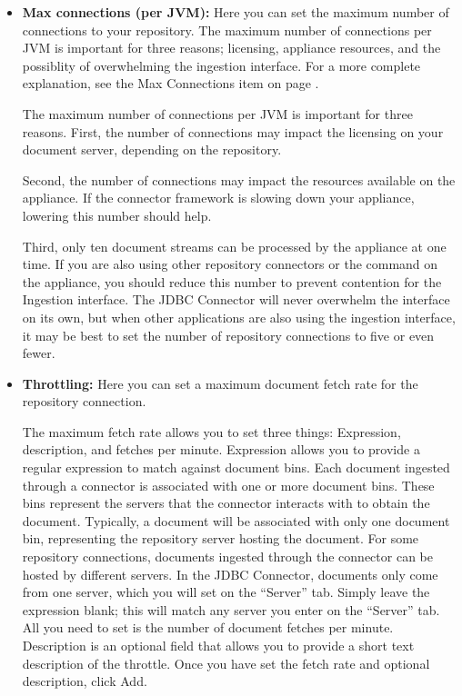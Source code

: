 \begin{itemize}

\item \textbf{Max connections (per JVM):} Here you can set the maximum
number of connections to your repository.  \ifCombinedConnectorGuide
The maximum number of connections per JVM is important for three
reasons; licensing, appliance resources, and the possiblity of
overwhelming the ingestion interface. For a more complete explanation,
see the Max Connections item on page \pageref{maxrepocon}.\fi

\ifJDBCGuide
The maximum number of connections per JVM is important for three reasons.
First, the number of connections may impact the licensing on your document
server, depending on the repository.

Second, the number of connections may impact the resources
available on the appliance. If the connector framework is slowing down
your appliance, lowering this number should help.

Third, only ten document streams can be processed by the appliance
at one time.  If you are also using other repository connectors or
the  command on the appliance, you should reduce this
number to prevent contention for the Ingestion interface. The JDBC
Connector will never overwhelm the interface on its own, but when other
applications are also using the ingestion interface, it may be best to
set the number of repository connections to five or even fewer.
\fi


\item \textbf{Throttling:} Here you can set a maximum document fetch
rate for the repository connection.

The maximum fetch rate allows you to set three things: Expression,
description, and fetches per minute. Expression allows you to provide
a regular expression to match against document bins.  Each document
ingested through a connector is associated with one or more document
bins. These bins represent the servers that the connector interacts
with to obtain the document.  Typically, a document will be associated
with only one document bin, representing the repository server hosting
the document. For some repository connections, documents ingested
through the connector can be hosted by different servers. In the JDBC
Connector, documents only come from one server, which you will set on
the ``Server'' tab. Simply leave the expression blank; this will match
any server you enter on the ``Server'' tab.  All you need to set is
the number of document fetches per minute.  Description is an optional
field that allows you to provide a short text description of the
throttle.  Once you have set the fetch rate and optional description,
click Add.


\end{itemize}

